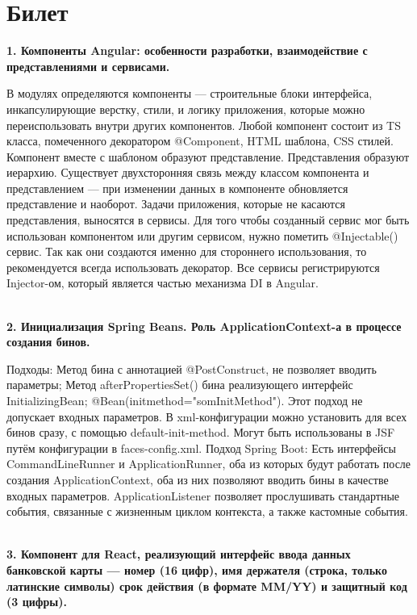 \documentclass{article}
\newcommand{\bil}[5]{%
        \section{Билет}
        \textbf{1. #1}

        #4
        \\
        \textbf{2. #2}
        
        #5
        \\
        \textbf{3. #3}
}
\begin{document}
\bil{Компоненты Angular: особенности разработки, взаимодействие с представлениями и сервисами.}
{Инициализация Spring Beans. Роль ApplicationContext-а в процессе создания бинов.}
{Компонент для React, реализующий интерфейс ввода данных банковской карты — номер (16 цифр), имя держателя (строка, только латинские символы) срок действия (в формате MM/YY) и защитный код (3 цифры).}{
    В модулях определяются компоненты — строительные блоки интерфейса, инкапсулирующие верстку, стили, и логику приложения, которые можно переиспользовать внутри других компонентов. 
    Любой компонент состоит из TS класса, помеченного декоратором @Component, HTML шаблона, CSS стилей. 
    Компонент вместе с шаблоном образуют представление. 
    Представления образуют иерархию. Существует двухсторонняя связь между классом компонента и представлением — при изменении данных в компоненте обновляется представление и наоборот. 
    Задачи приложения, которые не касаются представления, выносятся в сервисы. 
    Для того чтобы созданный сервис мог быть использован компонентом или другим сервисом, нужно пометить @Injectable() сервис. 
    Так как они создаются именно для стороннего использования, то рекомендуется всегда использовать декоратор. 
    Все сервисы регистрируются Injector-ом, который является частью механизма DI в Angular.
}{
    Подходы: Метод бина с аннотацией @PostConstruct, не позволяет вводить параметры; 
    Метод afterPropertiesSet() бина реализующего интерфейс InitializingBean; 
    @Bean(initmethod="somInitMethod"). Этот подход не допускает входных параметров. 
    В xml-конфигурации можно установить для всех бинов сразу, с помощью default-init-method. 
    Могут быть использованы в JSF путём конфигурации в faces-config.xml. 
    Подход Spring Boot: Есть интерфейсы CommandLineRunner и ApplicationRunner, оба из которых будут работать после создания ApplicationContext, оба из них позволяют вводить бины в качестве входных параметров. 
    ApplicationListener позволяет прослушивать стандартные события, связанные с жизненным циклом контекста, а также кастомные события.
}
\end{document}
